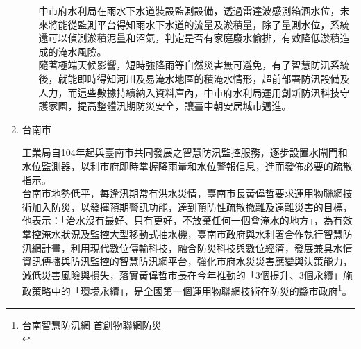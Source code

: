 \documentclass[a4paper,12pt]{article}
\begin{document}
\begin{enumerate}
\begin{enumerate}
中市府水利局在雨水下水道裝設監測設備，透過雷達波感測箱涵水位，未來將能從監測平台得知雨水下水道的流量及淤積量，除了量測水位，系統還可以偵測淤積泥量和沼氣，判定是否有家庭廢水偷排，有效降低淤積造成的淹水風險。\\

隨著極端天候影響，短時強降雨等自然災害無可避免，有了智慧防汛系統後，就能即時得知河川及易淹水地區的積淹水情形，超前部署防汛設備及人力，而這些數據持續納入資料庫內，中市府水利局運用創新防汛科技守護家園，提高整體汛期防災安全，讓臺中朝安居城市邁進。\\
\end{enumerate}

\item 台南市
\label{sec:orgd54ac84}

工業局自104年起與臺南市共同發展之智慧防汛監控服務，逐步設置水閘門和水位監測器，以利市府即時掌握降雨量和水位警報信息，進而發佈必要的疏散指示。\\

台南市地勢低平，每逢汛期常有洪水災情，臺南市長黃偉哲要求運用物聯網技術加入防災，以發揮預期警訊功能，達到預防性疏散撤離及遠離災害的目標，他表示：「治水沒有最好、只有更好，不放棄任何一個會淹水的地方」，為有效掌控淹水狀況及監控大型移動式抽水機，臺南市政府與水利署合作執行智慧防汛網計畫，利用現代數位傳輸科技，融合防災科技與數位經濟，發展兼具水情資訊傳播與防汛監控的智慧防汛網平台，強化市府水災災害應變與決策能力，減低災害風險與損失，落實黃偉哲市長在今年推動的「3個提升、3個永續」施政策略中的「環境永續」，是全國第一個運用物聯網技術在防災的縣市政府\footnote{\href{https://money.udn.com/money/story/5722/4508978}{台南智慧防汛網 首創物聯網防災}\\\label{orgf5f4675}}。\\


\end{enumerate}
\end{document}

